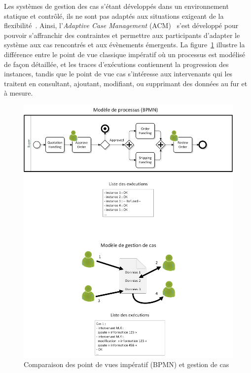 \bigskip

Les systèmes de gestion des cas s'étant développés dans un environnement statique et contrôlé, ils ne sont pas adaptés aux situations exigeant de la flexibilité~\cite{motahari2013adaptive}.
Ainsi, l'\textit{Adaptive Case Management} (ACM)~\cite{swenson2010mastering} s'est développé pour pouvoir s'affranchir des contraintes et permettre aux participants d'adapter le système aux cas rencontrés et aux évènements émergents.
La figure~\ref{figure:2-S1-KIP-Exemple-ACM} illustre la différence entre le point de vue classique impératif où un processus est modélisé de façon détaillée, et les traces d'exécutions contiennent la progression des instances, tandis que le point de vue cas s'intéresse aux intervenants qui les traitent en consultant, ajoutant, modifiant, ou supprimant des données au fur et à mesure.

\begin{figure}[ht]
\centering
\centerline{
\includegraphics[scale=0.65]{2-Etat-de-l'Art/images/KIP/ACM/Exemple_Cas_vs_BPMN_hauteur.png}
}
\caption{Comparaison des point de vues impératif (BPMN) et gestion de cas}
\label{figure:2-S1-KIP-Exemple-ACM}
\end{figure}


